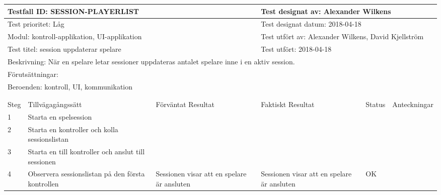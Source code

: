 

\begin{tabular}{| p{1cm}|  p{3cm} | p{3cm}| p{3cm}| p{2cm}| p{3cm}|}
	\hline
	  \multicolumn{3}{|l|}{Testfall ID: SESSION-PLAYERLIST}&\multicolumn{3}{|l|}{Test designat av: Alexander Wilkens}\\
	  \hline
	  \multicolumn{3}{|l|}{Test prioritet: Låg}&\multicolumn{3}{|l|}{Test designat datum: 2018-04-18}\\
	  \hline
	  \multicolumn{3}{|l|}{Modul: kontroll-applikation, UI-applikation}&\multicolumn{3}{|l|}{Test utfört av: Alexander Wilkens, David Kjellström}\\
	  \hline
	  \multicolumn{3}{|l|}{Test titel: session uppdaterar spelare}&\multicolumn{3}{|l|}{Test utfört: 2018-04-18}\\
	  \hline
	  \multicolumn{6}{|p{\textwidth}|}{Beskrivning: När en spelare letar sessioner uppdateras antalet spelare inne i en aktiv session.}\\
	  \hline
	  \multicolumn{6}{|p{\textwidth}|}{Förutsättningar:}\\
	  \hline
	  \multicolumn{6}{|p{\textwidth}|}{Beroenden: kontroll, UI, kommunikation}\\
  
	\hline
	\multicolumn{6}{|l|}{}\\
	\multicolumn{6}{|l|}{}\\
      	\hline
	Steg&Tillvägagångssätt&Förväntat Resultat&Faktiskt Resultat&Status&Anteckningar \\
	\hline
	1&Starta en spelsession&&&&\\
      	\hline
	2&Starta en kontroller och kolla sessionslistan&&&&\\
      	\hline
	3&Starta en till kontroller och anslut till sessionen&&&&\\
      	\hline
	4&Observera sessionslistan på den första kontrollen&Sessionen visar att en spelare är ansluten&Sessionen visar att en spelare är ansluten&OK&\\
      	\hline


	\end{tabular}



